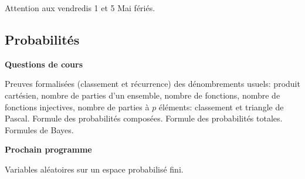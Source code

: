 





Attention aux vendredis 1 et 5 Mai fériés.




\subsection{Probabilités}


\bigskip
\begin{center}
 \textbf{Questions de cours}
\end{center}
Preuves formalisées (classement et récurrence) des dénombrements usuels:\newline
 produit cartésien,  nombre de parties d'un ensemble, nombre de fonctions, nombre de fonctions injectives, nombre de parties à $p$ éléments: classement et triangle de Pascal. \newline
Formule des probabilités composées.\newline
Formule des probabilités totales. \newline
Formules de Bayes. 


\bigskip
\begin{center}
 \textbf{Prochain programme}
\end{center}
Variables aléatoires sur un espace probabilisé fini.

